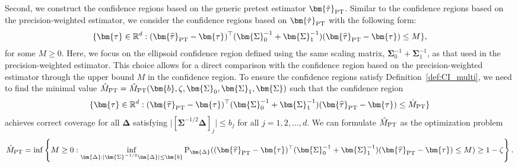 \documentclass[11pt]{article}
\def\P{{\mathrm P}}
\newcommand{\htau}{\widehat\tau}
\numberwithin{equation}{section}
\theoremstyle{definition}
\begin{document}
Second, we construct the confidence regions based on the generic pretest estimator $\bm{\hat\tau}_{\rm PT}$. Similar to the confidence regions based on the precision-weighted estimator, we consider the confidence regions based on $\bm{\hat\tau}_{\rm PT}$ with the following form:
\[
\{\bm{\tau}\in\mathbb{R}^d:(\bm{\htau}_{\rm PT}-\bm{\tau})^\top (\bm{\Sigma}_0^{-1} + \bm{\Sigma}_1^{-1})(\bm{\htau}_{\rm PT}-\bm{\tau})\le M\},
\]
for some $M \ge 0$. Here, we focus on the ellipsoid confidence region defined using the same scaling matrix, $\bm{\Sigma}_0^{-1} + \bm{\Sigma}_1^{-1}$, as that used in the precision-weighted estimator. This choice allows for a direct comparison with the confidence region based on the precision-weighted estimator through the upper bound $M$ in the confidence region. To ensure the confidence regions satisfy Definition~\ref{def:CI_multi}, we need to find the minimal value $\hat{M}_{\rm PT} = \hat{M}_{\rm PT}(\bm{b}, \zeta, \bm{\Sigma}_0, \bm{\Sigma}_1, \bm{\Sigma})$ such that the confidence region
\[
\{\bm{\tau}\in\mathbb{R}^d:(\bm{\htau}_{\rm PT}-\bm{\tau})^\top (\bm{\Sigma}_0^{-1} + \bm{\Sigma}_1^{-1})(\bm{\htau}_{\rm PT}-\bm{\tau})\le \hat{M}_{\rm PT}\}
\]
achieves correct coverage for all $\bm{\Delta}$ satisfying $\lvert [\bm{\Sigma}^{-1/2} \bm{\Delta}]_j \rvert \le b_j$ for all $j=1,2,\ldots,d$. We can formulate $\hat{M}_{\rm PT}$ as the optimization problem
\begin{align*}
  \hat{M}_{\rm PT} = \inf \left\{ M \ge 0: \inf_{\bm{\Delta}: \lvert \bm{\Sigma}^{-1/2} \bm{\Delta}\rvert \le \bm{b}} \P_{\bm{\Delta}}((\bm{\htau}_{\rm PT} - \bm{\tau})^\top (\bm{\Sigma}_0^{-1} + \bm{\Sigma}_1^{-1}) (\bm{\htau}_{\rm PT} - \bm{\tau}) \le M) \ge 1-\zeta \right\}.
\end{align*}
\end{document}

